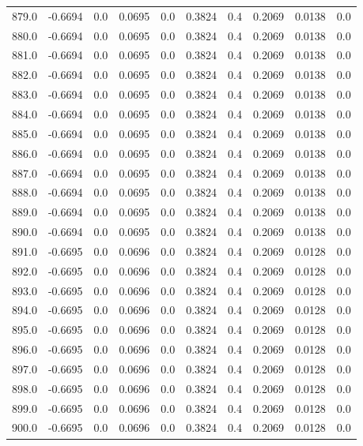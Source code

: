\begin{longtable}{lrrrrrrrrr}
879.0 & -0.6694 & 0.0 & 0.0695 & 0.0 & 0.3824 & 0.4 & 0.2069 & 0.0138 & 0.0 \\
880.0 & -0.6694 & 0.0 & 0.0695 & 0.0 & 0.3824 & 0.4 & 0.2069 & 0.0138 & 0.0 \\
881.0 & -0.6694 & 0.0 & 0.0695 & 0.0 & 0.3824 & 0.4 & 0.2069 & 0.0138 & 0.0 \\
882.0 & -0.6694 & 0.0 & 0.0695 & 0.0 & 0.3824 & 0.4 & 0.2069 & 0.0138 & 0.0 \\
883.0 & -0.6694 & 0.0 & 0.0695 & 0.0 & 0.3824 & 0.4 & 0.2069 & 0.0138 & 0.0 \\
884.0 & -0.6694 & 0.0 & 0.0695 & 0.0 & 0.3824 & 0.4 & 0.2069 & 0.0138 & 0.0 \\
885.0 & -0.6694 & 0.0 & 0.0695 & 0.0 & 0.3824 & 0.4 & 0.2069 & 0.0138 & 0.0 \\
886.0 & -0.6694 & 0.0 & 0.0695 & 0.0 & 0.3824 & 0.4 & 0.2069 & 0.0138 & 0.0 \\
887.0 & -0.6694 & 0.0 & 0.0695 & 0.0 & 0.3824 & 0.4 & 0.2069 & 0.0138 & 0.0 \\
888.0 & -0.6694 & 0.0 & 0.0695 & 0.0 & 0.3824 & 0.4 & 0.2069 & 0.0138 & 0.0 \\
889.0 & -0.6694 & 0.0 & 0.0695 & 0.0 & 0.3824 & 0.4 & 0.2069 & 0.0138 & 0.0 \\
890.0 & -0.6694 & 0.0 & 0.0695 & 0.0 & 0.3824 & 0.4 & 0.2069 & 0.0138 & 0.0 \\
891.0 & -0.6695 & 0.0 & 0.0696 & 0.0 & 0.3824 & 0.4 & 0.2069 & 0.0128 & 0.0 \\
892.0 & -0.6695 & 0.0 & 0.0696 & 0.0 & 0.3824 & 0.4 & 0.2069 & 0.0128 & 0.0 \\
893.0 & -0.6695 & 0.0 & 0.0696 & 0.0 & 0.3824 & 0.4 & 0.2069 & 0.0128 & 0.0 \\
894.0 & -0.6695 & 0.0 & 0.0696 & 0.0 & 0.3824 & 0.4 & 0.2069 & 0.0128 & 0.0 \\
895.0 & -0.6695 & 0.0 & 0.0696 & 0.0 & 0.3824 & 0.4 & 0.2069 & 0.0128 & 0.0 \\
896.0 & -0.6695 & 0.0 & 0.0696 & 0.0 & 0.3824 & 0.4 & 0.2069 & 0.0128 & 0.0 \\
897.0 & -0.6695 & 0.0 & 0.0696 & 0.0 & 0.3824 & 0.4 & 0.2069 & 0.0128 & 0.0 \\
898.0 & -0.6695 & 0.0 & 0.0696 & 0.0 & 0.3824 & 0.4 & 0.2069 & 0.0128 & 0.0 \\
899.0 & -0.6695 & 0.0 & 0.0696 & 0.0 & 0.3824 & 0.4 & 0.2069 & 0.0128 & 0.0 \\
900.0 & -0.6695 & 0.0 & 0.0696 & 0.0 & 0.3824 & 0.4 & 0.2069 & 0.0128 & 0.0 \\

\end{longtable}
